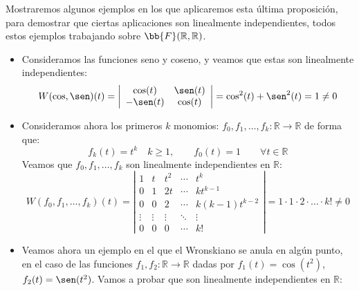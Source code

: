 \begin{ejemplo}
    Mostraremos algunos ejemplos en los que aplicaremos esta última proposición, para demostrar que ciertas aplicaciones son linealmente independientes, todos estos ejemplos trabajando sobre $\bb{F}(\mathbb{R},\mathbb{R})$.
    \begin{itemize}
        \item Consideramos las funciones seno y coseno, y veamos que estas son linealmente independientes:
            \begin{equation*}
                W(\cos, \sen)(t) = \left|\begin{array}{cc}
                    \cos(t) & \sen(t) \\
                    -\sen(t) & \cos(t) \\
                \end{array}\right| = \cos^2(t) + \sen^2(t) = 1 \neq 0
            \end{equation*}
        \item Consideramos ahora los primeros $k$ monomios: $f_0,f_1,\ldots,f_k:\mathbb{R}\rightarrow\mathbb{R}$ de forma que:
            \begin{equation*}
                f_k(t) = t^k \quad k\geq 1, \qquad f_0(t) = 1 \qquad \forall t\in \mathbb{R}
            \end{equation*}
            Veamos que $f_0,f_1,\ldots,f_k$ son linealmente independientes en $\mathbb{R}$:
            \begin{equation*}
                W(f_0,f_1,\ldots,f_k)(t) = \left|\begin{array}{ccccc}
                    1 & t & t^2 & \cdots & t^k \\
                    0 & 1 & 2t & \cdots & kt^{k-1} \\
                    0 & 0 & 2 & \cdots & k(k-1)t^{k-2} \\
                    \vdots & \vdots & \vdots & \ddots & \vdots \\
                    0 & 0 & 0 & \cdots & k!
                \end{array}\right| = 1\cdot 1\cdot 2\cdot \ldots \cdot k! \neq 0
            \end{equation*}
        \item Veamos ahora un ejemplo en el que el Wronskiano se anula en algún punto, en el caso de las funciones $f_1,f_2:\mathbb{R}\rightarrow\mathbb{R}$ dadas por $f_1(t) = \cos(t^2)$, $f_2(t) = \sen(t^2)$. Vamos a probar que son linealmente independientes en $\mathbb{R}$:

\end{itemize}
\end{ejemplo}
